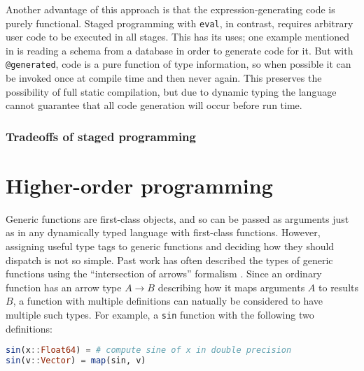 Another advantage of this approach is that the expression-generating
code is purely functional.
Staged programming with \texttt{eval}, in contrast, requires arbitrary
user code to be executed in all stages.
This has its uses; one example mentioned in \cite{DeVito:2014:FRG:2594291.2594307}
is reading a schema from a database in order to generate code for it.
But with \texttt{@generated}, code is a pure function of type information,
so when possible it can be invoked once at compile time and then
never again.
This preserves the possibility of full static compilation, but due to
dynamic typing the language cannot guarantee that all code generation
will occur before run time.


\subsubsection{Tradeoffs of staged programming}


\section{Higher-order programming}

Generic functions are first-class objects, and so can be passed as arguments
just as in any dynamically typed language with first-class functions.
However, assigning useful type tags to generic functions and deciding how
they should dispatch is not so simple.
Past work has often described the types of generic functions using the
``intersection of arrows'' formalism
\cite{RonchiDellaRocca:1988:PTS:55079.55086, Dunfield:2012:EIU:2364527.2364534,
boundedquant, Castagna:1995:COF:203496.203510}.
Since an ordinary function has an arrow type $A\rightarrow B$ describing how it
maps arguments $A$ to results $B$, a function with multiple definitions can
natually be considered to have multiple such types.
For example, a \texttt{sin} function with the following two definitions:

\begin{singlespace}
\begin{lstlisting}[language=julia]
sin(x::Float64) = # compute sine of x in double precision
sin(v::Vector) = map(sin, v)
\end{lstlisting}
\end{singlespace}

